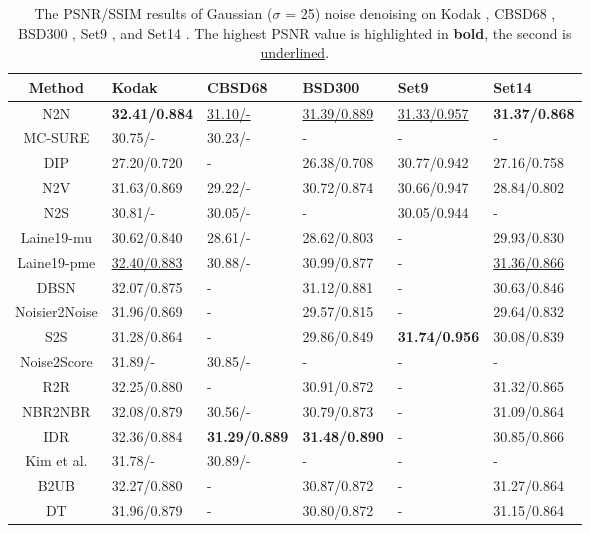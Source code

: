 \documentclass[conference]{IEEEtran}
\begin{document}
\begin{table*}[t]
	\setlength{\abovecaptionskip}{0pt}
	\setlength{\belowcaptionskip}{0pt}
	\caption{The PSNR/SSIM results of Gaussian ($\sigma$ = 25) noise denoising on Kodak \cite{franzen1999kodak}, CBSD68 \cite{roth2005fields}, BSD300 \cite{martin2001database}, Set9 \cite{ulyanov2018deep}, and Set14 \cite{zeyde2012single}. The highest PSNR value is highlighted in \textbf {bold}, the second is \underline{underlined}.}
	\centering
	\begin{tabular*}{\hsize}{c@{\extracolsep{\fill}}l@{\extracolsep{\fill}}l@{\extracolsep{\fill}}l@{\extracolsep{\fill}}l@{\extracolsep{\fill}}l@{\extracolsep{\fill}}}
		\hline
		Method	&Kodak&	CBSD68&	BSD300&	Set9&	Set14\\
		\hline
		N2N \cite{lehtinen2018noise2noise}	&{\bf 32.41/0.884}&	\underline{31.10/-}&	\underline{31.39/0.889}&	\underline{31.33/0.957}&	{\bf 31.37/0.868}\\
		MC-SURE \cite{ramani2008monte}&	30.75/-	&30.23/-&	-&	-&	-\\
		DIP \cite{ulyanov2018deep}&	27.20/0.720&	-&	26.38/0.708&	30.77/0.942&	27.16/0.758\\
		N2V \cite{krull2019noise2void}	&31.63/0.869&	29.22/-&	30.72/0.874&	30.66/0.947&	28.84/0.802\\
		N2S \cite{batson2019noise2self}	&30.81/-&	30.05/-&	-&	30.05/0.944&	-\\
		Laine19-mu \cite{laine2019high}&	30.62/0.840&	28.61/-&	28.62/0.803&	-&	29.93/0.830\\
		Laine19-pme \cite{laine2019high}&	\underline{32.40/0.883}&	30.88/-&	30.99/0.877&	-&	\underline{31.36/0.866}\\
		DBSN \cite{wu2020unpaired}&	32.07/0.875&	-&	31.12/0.881&	-&	30.63/0.846\\
		Noisier2Noise \cite{moran2020noisier2noise}&	31.96/0.869&	-&	29.57/0.815&	-&	29.64/0.832\\
		S2S \cite{quan2020self2self}&	31.28/0.864&	-&	29.86/0.849&	{\bf 31.74/0.956}&	30.08/0.839\\
		Noise2Score \cite{kim2021noise2score}&	31.89/-&	30.85/-&	-&	-&	-\\
		R2R \cite{pang2021recorrupted}&	32.25/0.880&	-&	30.91/0.872&	-&	31.32/0.865\\
		NBR2NBR \cite{huang2021neighbor2neighbor}&	32.08/0.879&	30.56/-&	30.79/0.873&	-&	31.09/0.864\\
		IDR \cite{zhang2022idr}&	32.36/0.884&	{\bf 31.29/0.889}&	{\bf 31.48/0.890}&	-&	30.85/0.866\\
		Kim et al. \cite{kim2022noise}&	31.78/-&	30.89/-&	-&	-&	-\\
		B2UB\cite{wang2022blind2unblind}	&32.27/0.880&	-	&30.87/0.872	&-	&31.27/0.864\\
		DT \cite{zhang2023self}	&31.96/0.879&	-&	30.80/0.872	&-	&31.15/0.864\\
		\hline
	\end{tabular*}
	\setlength{\belowcaptionskip}{-0.2cm}
	\label{tab:color_g_25}
\vspace{-1em}
\end{table*}
\end{document}
